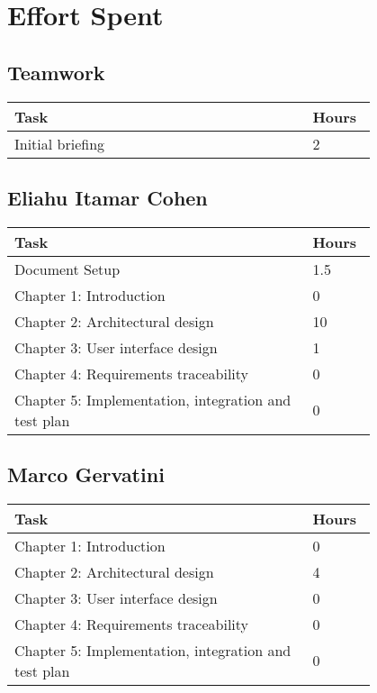 \chapter{Effort Spent}
\section{Teamwork}
\begin{center}
    \begin{tabular}{@{}p{0.7\linewidth} p{0.1\linewidth}@{}}
        \hline
        \textbf{Task} & \textbf{Hours} \\ \hline
        Initial briefing & 2 \\ \hline
    \end{tabular}
\end{center}

\section{Eliahu Itamar Cohen}
\begin{center}
    \begin{tabular}{@{}p{0.7\linewidth} p{0.1\linewidth}@{}}
        \hline
        \textbf{Task} & \textbf{Hours} \\ \hline
        Document Setup & 1.5 \\ \hline
        Chapter 1: Introduction & 0 \\ \hline
        Chapter 2: Architectural design & 10 \\ \hline
        Chapter 3: User interface design & 1 \\ \hline
        Chapter 4: Requirements traceability & 0 \\ \hline
        Chapter 5: Implementation, integration and test plan & 0 \\ \hline
     
    \end{tabular}
\end{center}

\section{Marco Gervatini}
\begin{center}
	\begin{tabular}{@{}p{0.7\linewidth} p{0.1\linewidth}@{}}
		\hline
		\textbf{Task} & \textbf{Hours} \\ \hline
             Chapter 1: Introduction & 0 \\ \hline
             Chapter 2: Architectural design & 4 \\ \hline
             Chapter 3: User interface design & 0 \\ \hline
             Chapter 4: Requirements traceability & 0 \\ \hline
             Chapter 5: Implementation, integration and test plan & 0 \\ \hline
	\end{tabular}
\end{center}

